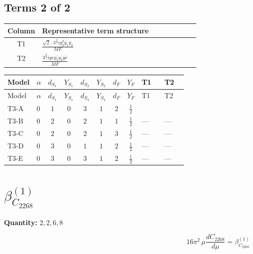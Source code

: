\documentclass[8pt]{article}
\begin{document}
\begin{landscape}
\subsection*{Terms 2 of 2}
\begin{center}
\begin{tabular}{@{}c >{\raggedright\arraybackslash}p{0.82\linewidth}@{}}
\toprule
Column & Representative term structure \\
\midrule
T1 & \(\displaystyle \frac{\sqrt{2} \cdot 3^{\frac{3}{4}} i g_{2}^{2} \overline{y_{1}} \overline{y_{2}}}{MF}\) \\
\midrule
T2 & \(\displaystyle \frac{3^{\frac{3}{4}} i ye \overline{y_{1}} \overline{y_{2}} \overline{ye}}{MF}\) \\
\midrule
\bottomrule
\end{tabular}
\end{center}
\smallskip
\tiny
\begin{longtable}{@{}llcccccc >{\raggedright\arraybackslash}p{0.21\linewidth} >{\raggedright\arraybackslash}p{0.21\linewidth}@{}}
\toprule
Model & $\alpha$ & $d_{S_1}$ & $Y_{S_1}$ & $d_{S_2}$ & $Y_{S_2}$ & $d_F$ & $Y_F$ & T1 & T2 \\
\midrule
\endfirsthead
\toprule
Model & $\alpha$ & $d_{S_1}$ & $Y_{S_1}$ & $d_{S_2}$ & $Y_{S_2}$ & $d_F$ & $Y_F$ & T1 & T2 \\
\midrule
\endhead
T3-A & $0$ & $1$ & $0$ & $3$ & $1$ & $2$ & $\frac{1}{2}$ & \scriptsize\adjustbox{max width=\linewidth}{$\begin{gathered} - \frac{\sqrt{2} \cdot 3^{\frac{3}{4}} i g_{2}^{2} \overline{y_{1}} \overline{y_{2}}}{3 MF}\end{gathered}$} & \scriptsize\adjustbox{max width=\linewidth}{$\begin{gathered} \frac{3^{\frac{3}{4}} i ye \overline{y_{1}} \overline{y_{2}} \overline{ye}}{12 MF}\end{gathered}$} \\
\midrule
T3-B & $0$ & $2$ & $0$ & $2$ & $1$ & $1$ & $\frac{1}{2}$ & --- & --- \\
\midrule
T3-C & $0$ & $2$ & $0$ & $2$ & $1$ & $3$ & $\frac{1}{2}$ & --- & --- \\
\midrule
T3-D & $0$ & $3$ & $0$ & $1$ & $1$ & $2$ & $\frac{1}{2}$ & --- & --- \\
\midrule
T3-E & $0$ & $3$ & $0$ & $3$ & $1$ & $2$ & $\frac{1}{2}$ & --- & --- \\
\midrule
\bottomrule
\end{longtable}
\clearpage
\section*{$\beta_{C_{2268}}^{(1)}$}
\noindent\textbf{Quantity: }$\mathrm{2,2,6,8}$\par\smallskip
\[16\pi^2\,\mu\frac{d C_{2268}}{d\mu}=\beta_{C_{2268}}^{(1)}\]

\end{landscape}
\end{document}
